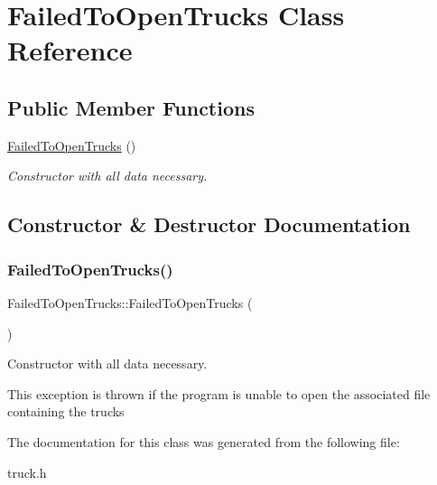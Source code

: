 \hypertarget{class_failed_to_open_trucks}{}\section{Failed\+To\+Open\+Trucks Class Reference}
\label{class_failed_to_open_trucks}
\subsection*{Public Member Functions}
\begin{DoxyCompactItemize}
\item 
\hyperlink{class_failed_to_open_trucks_aa2a2c15a2a19465a1d43a91d9abdf450}{Failed\+To\+Open\+Trucks} ()
\begin{DoxyCompactList}\small\item\em Constructor with all data necessary. \end{DoxyCompactList}\end{DoxyCompactItemize}


\subsection{Constructor \& Destructor Documentation}
\mbox{\label{class_failed_to_open_trucks_aa2a2c15a2a19465a1d43a91d9abdf450}} 
\subsubsection{\texorpdfstring{Failed\+To\+Open\+Trucks()}{FailedToOpenTrucks()}}
{\footnotesize\ttfamily Failed\+To\+Open\+Trucks\+::\+Failed\+To\+Open\+Trucks (\begin{DoxyParamCaption}{ }\end{DoxyParamCaption})\hspace{0.3cm}{\ttfamily [inline]}}



Constructor with all data necessary. 

This exception is thrown if the program is unable to open the associated file containing the trucks 

The documentation for this class was generated from the following file\+:\begin{DoxyCompactItemize}
\item 
truck.\+h\end{DoxyCompactItemize}
